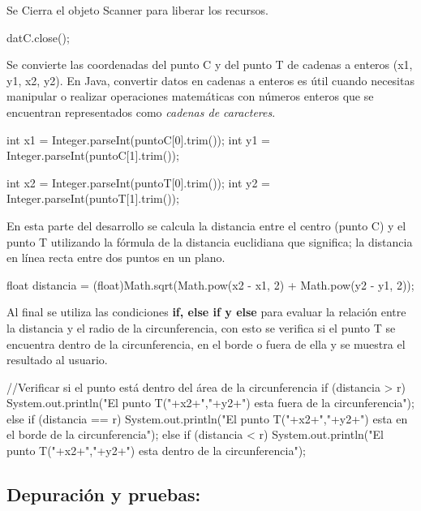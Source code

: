 Se Cierra el objeto Scanner para liberar los recursos.
\begin{javaCode}
                  datC.close(); 
\end{javaCode}
Se convierte las coordenadas del punto C y del punto T de cadenas a enteros (x1, y1, x2, y2).
En Java, convertir datos en cadenas a enteros es útil cuando necesitas manipular o realizar operaciones matemáticas con números enteros que se encuentran representados como \textit{cadenas de caracteres}.
\begin{javaCode}
int x1 = Integer.parseInt(puntoC[0].trim());
int y1 = Integer.parseInt(puntoC[1].trim());
        
int x2 = Integer.parseInt(puntoT[0].trim());
int y2 = Integer.parseInt(puntoT[1].trim());
\end{javaCode}

En esta parte del desarrollo se calcula la distancia entre el centro (punto C) y el punto T utilizando la fórmula de la distancia euclidiana que significa; la distancia en línea recta entre dos puntos en un plano.
\begin{javaCode}
float distancia = (float)Math.sqrt(Math.pow(x2 - x1, 2) + Math.pow(y2 - y1, 2));   
\end{javaCode}

Al final se utiliza las condiciones \textbf{if, else if y else} para evaluar la relación entre la distancia y el radio de la circunferencia, con esto se verifica si el punto T se encuentra dentro de la circunferencia, en el borde o fuera de ella y se muestra el resultado al usuario.
\begin{javaCode}
//Verificar si el punto está dentro del área de la circunferencia
     if (distancia > r) {
    System.out.println("El punto T("+x2+","+y2+") esta fuera de la circunferencia");
    }else if (distancia == r) {
     System.out.println("El punto T("+x2+","+y2+") esta en el borde de la circunferencia");
    }else if (distancia < r){
     System.out.println("El punto T("+x2+","+y2+") esta dentro de la circunferencia"); }
\end{javaCode}

\subsection{\textbf{Depuración y pruebas:}}

